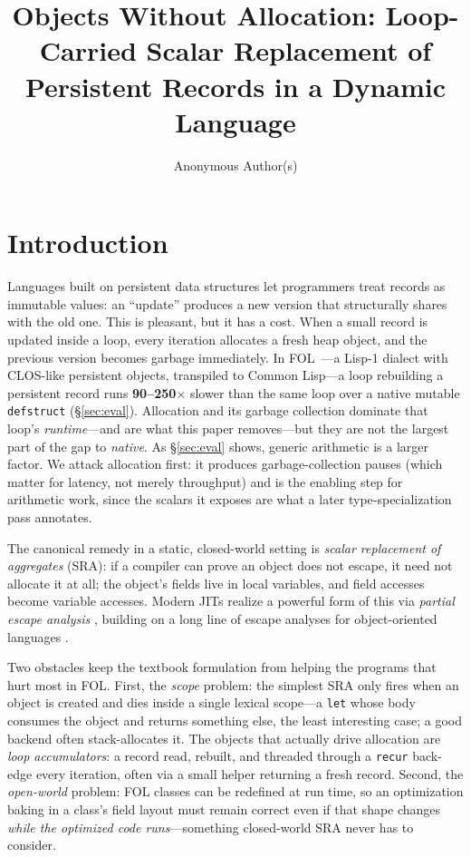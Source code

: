 \documentclass[sigplan,screen,review,anonymous]{acmart}
\title[Objects Without Allocation]{Objects Without Allocation: Loop-Carried Scalar Replacement of Persistent Records in a Dynamic Language}
\author{Anonymous Author(s)}
\affiliation{%
  \institution{Anonymous Institution}
  \city{Anonymous City}
  \country{Anonymous Country}
}
\begin{document}
\maketitle

\section{Introduction}
\label{sec:intro}

Languages built on persistent data structures let programmers treat records as
immutable values: an ``update'' produces a new version that structurally shares
with the old one. This is pleasant, but it has a cost. When
a small record is updated inside a loop, every iteration allocates a fresh
heap object, and the previous version becomes garbage immediately. In
FOL~\cite{adrian2026fol-els}---a Lisp-1 dialect with CLOS-like persistent
objects, transpiled to Common Lisp---a loop rebuilding a persistent record runs \textbf{90--250$\times$}
slower than the same loop over a native mutable \texttt{defstruct}
(\S\ref{sec:eval}). Allocation and its garbage collection dominate that loop's
\emph{runtime}---and are what this paper removes---but they are not the largest
part of the gap to \emph{native}. As \S\ref{sec:eval} shows, generic arithmetic
is a larger factor. We attack allocation first: it
produces garbage-collection pauses (which matter for latency, not merely
throughput) and is the enabling step for arithmetic work, since the scalars
it exposes are what a later type-specialization pass annotates.

The canonical remedy in a static, closed-world setting is \emph{scalar
replacement of aggregates} (SRA): if a compiler can prove an object does not
escape, it need not allocate it at all; the object's fields live in
local variables, and field accesses become variable accesses. Modern
JITs realize a powerful form of this via \emph{partial escape
analysis} \cite{stadler2014partial}, building on a long line of escape analyses
for object-oriented languages \cite{choi1999escape,blanchet2003escape}.

Two obstacles keep the textbook formulation from helping the programs that hurt
most in FOL. First, the \emph{scope} problem: the simplest SRA
only fires when an object is created and dies inside a single lexical
scope---a \texttt{let} whose body consumes the object and returns something
else, the least interesting case; a good backend often stack-allocates
it. The objects that actually drive allocation are \emph{loop
accumulators}: a record read, rebuilt, and threaded through a
\texttt{recur} back-edge every iteration, often via a
small helper returning a fresh record. Second, the \emph{open-world}
problem: FOL classes can be redefined at run time, so an optimization baking in
a class's field layout must remain correct even if that shape changes
\emph{while the optimized code runs}---something closed-world SRA never
has to consider.
\end{document}
